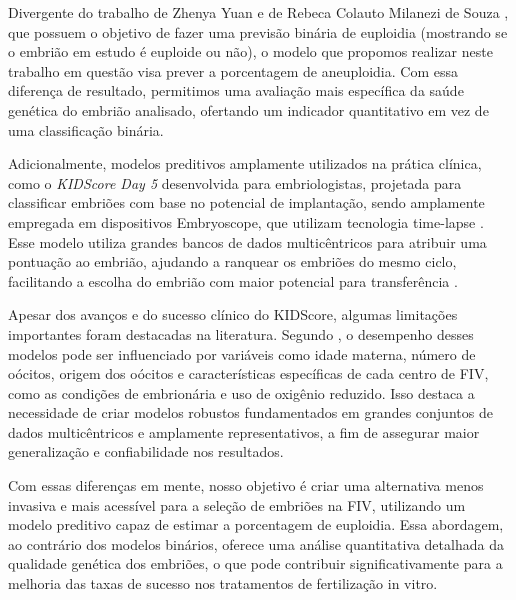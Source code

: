 Divergente do trabalho de Zhenya Yuan \cite{yuan2023} e de Rebeca Colauto Milanezi de Souza \cite{souzarebeca2022}, que possuem o objetivo de fazer uma previsão binária de euploidia (mostrando se o embrião em estudo é euploide ou não), o modelo que propomos realizar neste trabalho em questão visa prever a porcentagem de aneuploidia. Com essa diferença de resultado, permitimos uma avaliação mais específica da saúde genética do embrião analisado, ofertando um indicador quantitativo em vez de uma classificação binária.

Adicionalmente, modelos preditivos amplamente utilizados na prática clínica, como o \textit{KIDScore\texttrademark{} Day 5} desenvolvida para embriologistas, projetada para classificar embriões com base no potencial de implantação, sendo amplamente empregada em dispositivos Embryoscope\texttrademark{}, que utilizam tecnologia time-lapse \cite{reignier2019}. Esse modelo utiliza grandes bancos de dados multicêntricos para atribuir uma pontuação ao embrião, ajudando a ranquear os embriões do mesmo ciclo, facilitando a escolha do embrião com maior potencial para transferência \cite{reignier2019}.

Apesar dos avanços e do sucesso clínico do KIDScore\texttrademark{}, algumas limitações importantes foram destacadas na literatura. Segundo , o desempenho desses modelos pode ser influenciado por variáveis como idade materna, número de oócitos, origem dos oócitos e características específicas de cada centro de FIV, como as condições de  embrionária e uso de oxigênio reduzido. Isso destaca a necessidade de criar modelos robustos fundamentados em grandes conjuntos de dados multicêntricos e amplamente representativos, a fim de assegurar maior generalização e confiabilidade nos resultados.

Com essas diferenças em mente, nosso objetivo é criar uma alternativa menos invasiva e mais acessível para a seleção de embriões na FIV, utilizando um modelo preditivo capaz de estimar a porcentagem de euploidia. Essa abordagem, ao contrário dos modelos binários, oferece uma análise quantitativa detalhada da qualidade genética dos embriões, o que pode contribuir significativamente para a melhoria das taxas de sucesso nos tratamentos de fertilização in vitro.